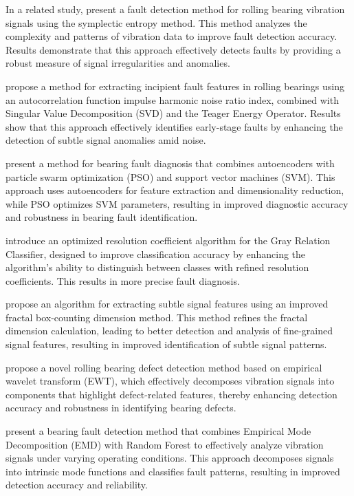 \documentclass[sn-basic,pdflatex]{sn-jnl}
\theoremstyle{remark}
\theoremstyle{definition}
\begin{document}
In a related study, \citet{WOS:000419006900041} present a fault
detection method for rolling bearing vibration signals using the
symplectic entropy method. This method analyzes the complexity and
patterns of vibration data to improve fault detection accuracy. Results
demonstrate that this approach effectively detects faults by providing a
robust measure of signal irregularities and anomalies.

\citet{WOS:000416794600016} propose a method for extracting incipient
fault features in rolling bearings using an autocorrelation function
impulse harmonic noise ratio index, combined with Singular Value
Decomposition (SVD) and the Teager Energy Operator. Results show that
this approach effectively identifies early-stage faults by enhancing the
detection of subtle signal anomalies amid noise.

\citet{WOS:000484465800028} present a method for bearing fault diagnosis
that combines autoencoders with particle swarm optimization (PSO) and
support vector machines (SVM). This approach uses autoencoders for
feature extraction and dimensionality reduction, while PSO optimizes SVM
parameters, resulting in improved diagnostic accuracy and robustness in
bearing fault identification.

\citet{WOS:000477760600037} introduce an optimized resolution
coefficient algorithm for the Gray Relation Classifier, designed to
improve classification accuracy by enhancing the algorithm's ability to
distinguish between classes with refined resolution coefficients. This
results in more precise fault diagnosis.

\citet{WOS:000477760600061} propose an algorithm for extracting subtle
signal features using an improved fractal box-counting dimension method.
This method refines the fractal dimension calculation, leading to better
detection and analysis of fine-grained signal features, resulting in
improved identification of subtle signal patterns.

\citet{WOS:000467079500501} propose a novel rolling bearing defect
detection method based on empirical wavelet transform (EWT), which
effectively decomposes vibration signals into components that highlight
defect-related features, thereby enhancing detection accuracy and
robustness in identifying bearing defects.

\citet{WOS:000459864800144} present a bearing fault detection method
that combines Empirical Mode Decomposition (EMD) with Random Forest to
effectively analyze vibration signals under varying operating
conditions. This approach decomposes signals into intrinsic mode
functions and classifies fault patterns, resulting in improved detection
accuracy and reliability.
\end{document}
